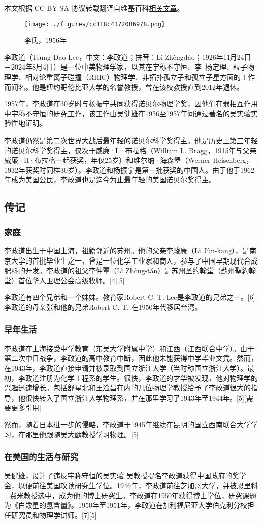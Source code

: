
本文根据 CC-BY-SA 协议转载翻译自维基百科\href{https://en.wikipedia.org/wiki/Tsung-Dao_Lee}{相关文章}。

\begin{figure}[ht]
\centering
\texttt{[image: ./figures/cc118c4172086978.png]}
\caption{李氏，1956年} \label{fig_Tsung_1}
\end{figure}
李政道（Tsung-Dao Lee，中文：李政道；拼音：Lǐ Zhèngdào；1926年11月24日－2024年8月4日）是一位中美物理学家，以其在宇称不守恒、李–杨定理、粒子物理学、相对论重离子碰撞（RHIC）物理学、非拓扑孤立子和孤立子星方面的工作而闻名。他是纽约哥伦比亚大学的名誉教授，曾在该校教授直到2012年退休。

1957年，李政道在30岁时与杨振宁共同获得诺贝尔物理学奖，因他们在弱相互作用中宇称不守恒的研究工作，该工作由吴健雄在1956至1957年间通过著名的吴实验实验性地证明。

李政道仍然是第二次世界大战后最年轻的诺贝尔科学奖得主。他是历史上第三年轻的诺贝尔科学奖得主，仅次于威廉·L·布拉格（William L. Bragg，1915年与父亲威廉·H·布拉格一起获奖，年仅25岁）和维尔纳·海森堡（Werner Heisenberg，1932年获奖时同样30岁）。李政道和杨振宁是第一批获奖的中国人。由于他于1962年成为美国公民，李政道也是迄今为止最年轻的美国诺贝尔奖得主。
\subsection{传记}  
\subsubsection{家庭}  
李政道出生于中国上海，祖籍邻近的苏州。他的父亲李駿康（Lǐ Jùn-kāng），是南京大学的首批毕业生之一，曾是一位化学工业家和商人，参与了中国早期现代合成肥料的开发。李政道的祖父李仲覃（Lǐ Zhòng-tán）是苏州圣约翰堂（蘇州聖約翰堂）首位华人卫理公会高级牧师。[4][5]

李政道有四个兄弟和一个妹妹。教育家Robert C. T. Lee是李政道的兄弟之一。[6] 李政道的母亲张和他的兄弟Robert C. T. 在1950年代移居台湾。
\subsubsection{早年生活}  
李政道在上海接受中学教育（东吴大学附属中学）和江西（江西联合中学）。由于第二次中日战争，李政道的高中教育中断，因此他未能获得中学毕业文凭。然而，在1943年，李政道直接申请并被录取到国立浙江大学（当时称国立浙江大学）。最初，李政道注册为化学工程系的学生。很快，李政道的才华被发现，他对物理学的兴趣迅速增长。包括舒星北和王淦昌在内的几位物理学教授给予了李政道很大的指导，他很快转入了国立浙江大学物理系，并在那里学习了1943年至1944年。[5][需要更多引用]

然而，随着日本进一步的侵略，李政道于1945年继续在昆明的国立西南联合大学学习，在那里他跟随吴大猷教授学习物理。[5]
\subsubsection{在美国的生活与研究}  
吴健雄，设计了违反宇称守恒的吴实验  
吴教授提名李政道获得中国政府的奖学金，以便前往美国攻读研究生学位。1946年，李政道前往芝加哥大学，并被恩里科·费米教授选中，成为他的博士研究生。李政道在1950年获得博士学位，研究课题为《白矮星的氢含量》。1950年至1951年，李政道在加利福尼亚大学伯克利分校担任研究员和物理学讲师。[7][5]

